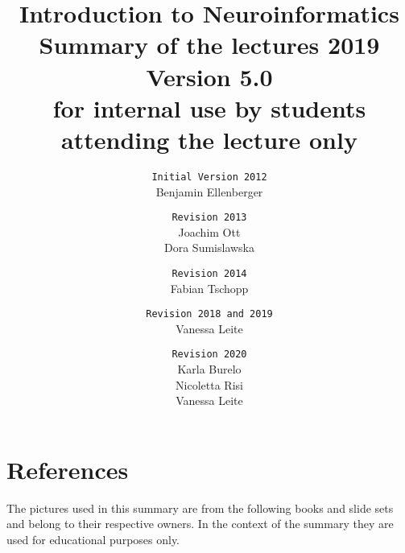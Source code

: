 \documentclass[a4paper, 12pt]{article}
\title{\textbf{Introduction to Neuroinformatics} \\Summary of the lectures
2019\\\normalsize Version 5.0 \\
for internal use by students attending the lecture only}
\author{
\texttt{Initial Version 2012}\\
	Benjamin Ellenberger
\and
\texttt{Revision 2013}\\
	Joachim Ott\\Dora Sumislawska
\and
\texttt{Revision 2014}\\
	Fabian Tschopp
\and
\texttt{Revision 2018 and 2019}\\
	Vanessa Leite
\and
\texttt{Revision 2020}\\
	Karla Burelo\\ Nicoletta Risi\\ Vanessa Leite}
\date{}
\begin{document}
\maketitle
\newpage
\tableofcontents
\newpage

\newpage




























\newpage

\section{References}
The pictures used in this summary are from the following books and slide sets and belong to their respective owners.
In the context of the summary they are used for educational purposes only.
\end{document}
